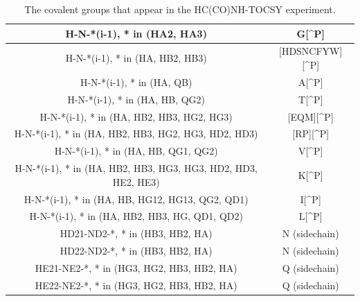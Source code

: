 \begin{table}
  \begin{tabular}{ | c | c | }
    \hline
    H-N-*(i-1), * in (HA2, HA3)                         &  G[\^{}P]             \\  \hline
    H-N-*(i-1), * in (HA, HB2, HB3)                     &  [HDSNCFYW][\^{}P]    \\  \hline
    H-N-*(i-1), * in (HA, QB)                           &  A[\^{}P]             \\  \hline
    H-N-*(i-1), * in (HA, HB, QG2)                      &  T[\^{}P]             \\  \hline
    H-N-*(i-1), * in (HA, HB2, HB3, HG2, HG3)           &  [EQM][\^{}P]         \\  \hline
    H-N-*(i-1), * in (HA, HB2, HB3, HG2, HG3, HD2, HD3) &  [RP][\^{}P]          \\  \hline
    H-N-*(i-1), * in (HA, HB, QG1, QG2)                 &  V[\^{}P]             \\  \hline
    H-N-*(i-1), * in (HA, HB2, HB3, HG3, HG3, HD2, HD3, HE2, HE3)   &  K[\^{}P] \\  \hline
    H-N-*(i-1), * in (HA, HB, HG12, HG13, QG2, QD1)     &  I[\^{}P]             \\  \hline
    H-N-*(i-1), * in (HA, HB2, HB3, HG, QD1, QD2)       &  L[\^{}P]             \\  \hline
    HD21-ND2-*, * in (HB3, HB2, HA)   &  N (sidechain)                  \\  \hline
    HD22-ND2-*, * in (HB3, HB2, HA)   &  N (sidechain)                  \\  \hline
    HE21-NE2-*, * in (HG3, HG2, HB3, HB2, HA)   &  Q (sidechain)        \\  \hline
    HE22-NE2-*, * in (HG3, HG2, HB3, HB2, HA)   &  Q (sidechain)        \\  \hline
  \end{tabular}
  \caption{The covalent groups that appear in the HC(CO)NH-TOCSY experiment.}
  \label{hcconh_peaktypes}
\end{table}


